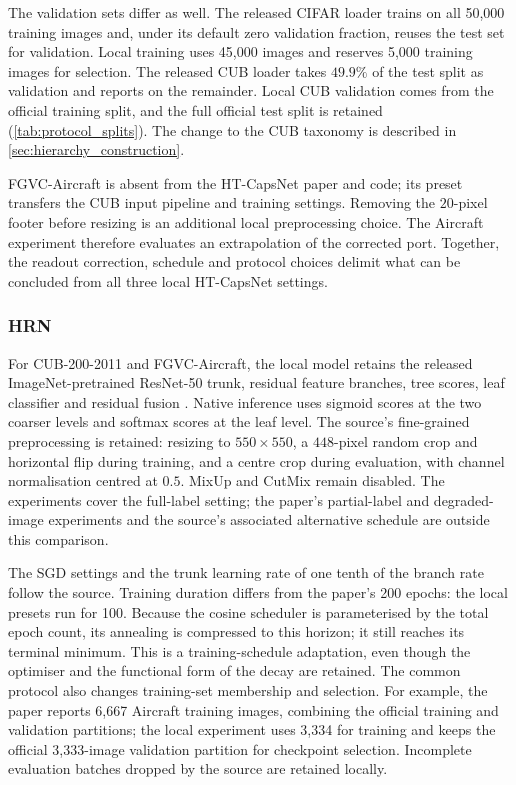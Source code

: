 The validation sets differ as well. The released CIFAR loader trains on all
50,000 training images and, under its default zero validation fraction, reuses
the test set for validation. Local training uses 45,000 images and reserves
5,000 training images for selection. The released CUB loader takes $49.9\%$
of the test split as validation and reports on the remainder. Local CUB
validation comes from the official training split, and the full official test
split is retained (\cref{tab:protocol_splits}). The change to the CUB taxonomy
is described in \cref{sec:hierarchy_construction}.

FGVC-Aircraft is absent from the HT-CapsNet paper and code; its preset transfers
the CUB input pipeline and training settings. Removing the $20$-pixel footer
before resizing is an additional local preprocessing choice. The Aircraft
experiment therefore evaluates an extrapolation of the corrected port.
Together, the readout correction, schedule and protocol choices delimit what
can be concluded from all three local HT-CapsNet settings.

\subsubsection{HRN}
\label{sssec:fidelity_hrn}

For CUB-200-2011 and FGVC-Aircraft, the local model retains the released
ImageNet-pretrained ResNet-50 trunk, residual feature branches, tree scores,
leaf classifier and residual fusion \cite{chen2022label}. Native inference
uses sigmoid scores at the two coarser levels and softmax scores at the leaf
level. The source's fine-grained preprocessing is retained: resizing to
$550\times550$, a $448$-pixel random crop and horizontal flip during training,
and a centre crop during evaluation, with channel normalisation centred at
$0.5$. MixUp and CutMix remain disabled. The experiments cover the full-label
setting; the paper's partial-label and degraded-image experiments and the
source's associated alternative schedule are outside this comparison.

The SGD settings and the trunk learning rate of one tenth of the branch rate
follow the source. Training duration differs from the paper's 200 epochs:
the local presets run for 100. Because the cosine scheduler is parameterised
by the total epoch count, its annealing is compressed to this horizon; it
still reaches its terminal minimum. This is a training-schedule adaptation,
even though the optimiser and the functional form of the decay are retained.
The common protocol also changes training-set membership and selection. For
example, the paper reports 6,667 Aircraft training images, combining the
official training and validation partitions; the local experiment uses 3,334
for training and keeps the official 3,333-image validation partition for
checkpoint selection. Incomplete evaluation batches dropped by the source
are retained locally.

